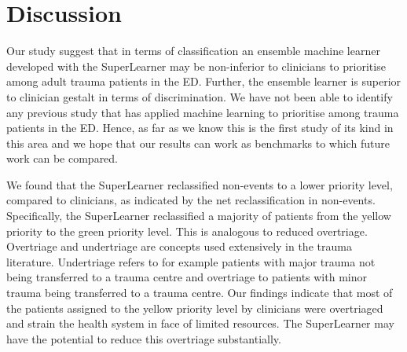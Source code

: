 \documentclass[10pt,letterpaper]{article}\usepackage[]{graphicx}\usepackage[]{color}
\newlength\savedwidth
\newcommand\thickhline{\noalign{\global\savedwidth\arrayrulewidth\global\arrayrulewidth 2pt}%
\hline
\noalign{\global\arrayrulewidth\savedwidth}}
\begin{document}

\section*{Discussion}
Our study suggest that in terms of classification an ensemble machine learner
developed with the SuperLearner may be non-inferior to clinicians to prioritise
among adult trauma patients in the ED. Further, the ensemble learner is superior
to clinician gestalt in terms of discrimination. We have not been able to
identify any previous study that has applied machine learning to prioritise
among trauma patients in the ED. Hence, as far as we know this is the first
study of its kind in this area and we hope that our results can work as
benchmarks to which future work can be compared.

We found that the SuperLearner reclassified non-events to a lower priority
level, compared to clinicians, as indicated by the net reclassification in
non-events. Specifically, the SuperLearner reclassified a majority of patients
from the yellow priority to the green priority level. This is analogous to
reduced overtriage. Overtriage and undertriage are concepts used extensively in
the trauma literature. Undertriage refers to for example patients with major
trauma not being transferred to a trauma centre and overtriage to patients with
minor trauma being transferred to a trauma centre. Our findings indicate that
most of the patients assigned to the yellow priority level by clinicians were
overtriaged and strain the health system in face of limited resources. The
SuperLearner may have the potential to reduce this overtriage substantially.
\end{document}
